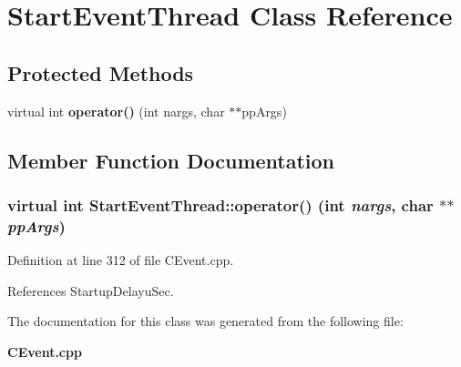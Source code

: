 \section{Start\-Event\-Thread  Class Reference}
\label{classStartEventThread}
\subsection*{Protected Methods}
\begin{CompactItemize}
\item 
virtual int {\bf operator()} (int nargs, char $\ast$$\ast$pp\-Args)
\end{CompactItemize}


\subsection{Member Function Documentation}
\subsubsection{\setlength{\rightskip}{0pt plus 5cm}virtual int Start\-Event\-Thread::operator() (int {\em nargs}, char $\ast$$\ast$ {\em pp\-Args})\hspace{0.3cm}{\tt  [inline, protected, virtual]}}\label{classStartEventThread_b0}




Definition at line 312 of file CEvent.cpp.

References Startup\-Delayu\-Sec.

The documentation for this class was generated from the following file:\begin{CompactItemize}
\item 
{\bf CEvent.cpp}\end{CompactItemize}
